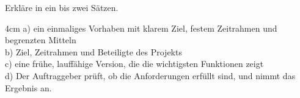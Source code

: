 \question[4]
Erkläre in ein bis zwei Sätzen.
\begin{solutionbox}{4cm}
a) ein einmaliges Vorhaben mit klarem Ziel, festem Zeitrahmen und begrenzten Mitteln \\
b) Ziel, Zeitrahmen und Beteiligte des Projekts \\
c) eine frühe, lauffähige Version, die die wichtigsten Funktionen zeigt \\
d) Der Auftraggeber prüft, ob die Anforderungen erfüllt sind, und nimmt das Ergebnis an.
\end{solutionbox}
